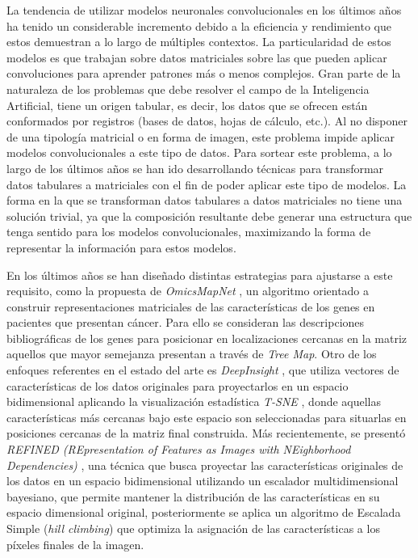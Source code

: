La tendencia de utilizar modelos neuronales convolucionales en los últimos años ha tenido un considerable incremento debido a la eficiencia y rendimiento que estos demuestran a lo largo de múltiples contextos. La particularidad de estos modelos es que trabajan sobre datos matriciales sobre las que pueden aplicar convoluciones para aprender patrones más o menos complejos. Gran parte de la naturaleza de los problemas que debe resolver el campo de la Inteligencia Artificial, tiene un origen tabular, es decir, los datos que se ofrecen están conformados por registros (bases de datos, hojas de cálculo, etc.). Al no disponer de una tipología matricial o en forma de imagen, este problema impide aplicar modelos convolucionales a este tipo de datos. Para sortear este problema, a lo largo de los últimos años se han ido desarrollando técnicas para transformar datos tabulares a matriciales con el fin de poder aplicar este tipo de modelos. La forma en la que se transforman datos tabulares a datos matriciales no tiene una solución trivial, ya que la composición resultante debe generar una estructura que tenga sentido para los modelos convolucionales, maximizando la forma de representar la información para estos modelos. 

En los últimos años se han diseñado distintas estrategias para ajustarse a este requisito, como la propuesta de \textit{OmicsMapNet} \cite{ma2019omicsmapnet}, un algoritmo orientado a construir representaciones matriciales de las características de los genes en pacientes que presentan cáncer. Para ello se consideran las descripciones bibliográficas de los genes para posicionar en localizaciones cercanas en la matriz aquellos que mayor semejanza presentan a través de \textit{Tree Map}. Otro de los enfoques referentes en el estado del arte es \textit{DeepInsight} \cite{Sharma2019}, que utiliza vectores de características de los datos originales para proyectarlos en un espacio bidimensional aplicando la visualización estadística \textit{T-SNE} \cite{van2008visualizing}, donde aquellas características más cercanas bajo este espacio son seleccionadas para situarlas en posiciones cercanas de la matriz final construida. Más recientemente, se presentó \textit{REFINED (REpresentation of Features as Images with NEighborhood Dependencies)} \cite{Bazgir2020}, una técnica que busca proyectar las características originales de los datos en un espacio bidimensional utilizando un escalador multidimensional bayesiano, que permite mantener la distribución de las características en su espacio dimensional original, posteriormente se aplica un algoritmo de Escalada Simple (\textit{hill climbing}) que optimiza la asignación de las características a los píxeles finales de la imagen.

